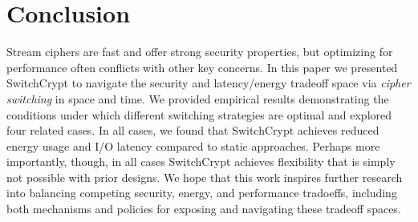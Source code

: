 \section{Conclusion}\label{sec:conclusion}


Stream ciphers are fast and offer strong security properties, but optimizing for
performance often conflicts with other key concerns. In this paper we presented
SwitchCrypt to navigate the security and latency/energy tradeoff space via
\emph{cipher switching} in space and time. We provided empirical results
demonstrating the conditions under which different switching strategies are
optimal and explored four related cases. In all cases, we found that SwitchCrypt
achieves reduced energy usage and I/O latency compared to static approaches. 
Perhaps more importantly, though, in all cases SwitchCrypt achieves flexibility that 
is simply not possible with prior designs.  We hope 
that this work inspires further research into balancing competing security, 
energy, and performance tradoeffs, 
including both mechanisms and policies for exposing and navigating 
these tradeoff spaces.


